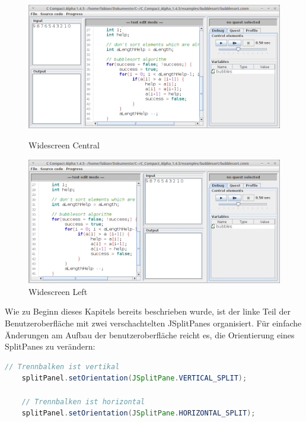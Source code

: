 \begin{figure}
\centering
	\begin{minipage}{0.45\textwidth}
		\centering
		\includegraphics[width=1.0\textwidth]{./media/images/gui/main/orientations/CCompact-gui-3.png}
		\caption{Widescreen Central}\label{fig:gui-main-left-o3}
	\end{minipage}\hfill
	\begin{minipage}{0.45\textwidth}
		\centering
		\includegraphics[width=1.0\textwidth]{./media/images/gui/main/orientations/CCompact-gui-4.png}
		\caption{Widescreen Left}\label{fig:gui-main-left-o4}
	\end{minipage}
\end{figure}

Wie zu Beginn dieses Kapitels bereits beschrieben wurde, ist der linke Teil der Benutzeroberfläche mit zwei verschachtelten JSplitPanes organisiert. Für einfache Änderungen am Aufbau der benutzeroberfläche reicht es, die Orientierung eines SplitPanes zu verändern:

\begin{lstlisting}[language=JAVA]
	// Trennbalken ist vertikal
	splitPanel.setOrientation(JSplitPane.VERTICAL_SPLIT);
	
	// Trennbalken ist horizontal
	splitPanel.setOrientation(JSplitPane.HORIZONTAL_SPLIT);
\end{lstlisting}

